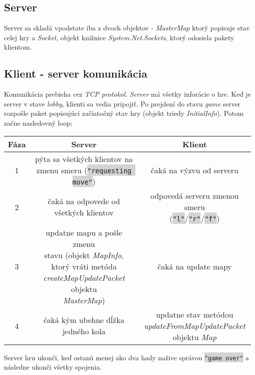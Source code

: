 \documentclass{article}
\newcommand{\code}[1]{\colorbox{lightgray}{\lstinline{#1}}}
\begin{document}
\subsection{Server}

Server sa skladá vpodstate iba z dvoch objektov - \textit{MasterMap} ktorý popisuje stav celej hry a \textit{Socket}, objekt knižnice \textit{System.Net.Sockets}, ktorý odosiela pakety klientom.

\subsection{Klient - server komunikácia}

Komunikácia prebieha cez \textit{TCP protokol}. \textit{Server} má všetky inforácie o hre.
Keď je server v stave \textit{lobby}, klienti sa vedia pripojiť. Po prejdení do stavu \textit{game} server rozpošle paket popisujúci začiatočný stav hry (objekt triedy \textit{InitialInfo}). Potom začne nasledovný loop:

\begin{center}
    \begin{tabular}{|c|c|c|}
        \hline
        Fáza & \textbf{Server} & \textbf{Klient} \\
        \hline
        \hline
        1 & \makecell{pýta sa všetkých klientov na \\zmenu smeru (\code{"requesting move"})} & čaká na výzvu od serveru \\
        \hline
        2 & čaká na odpovede od všetkých klientov & \makecell{odpovedá serveru zmenou smeru\\ (\code{"l"}/\code{"r"}/\code{"f"})}\\
        \hline
        3 & \makecell{updatne mapu a pošle zmenu\\stavu (objekt \textit{MapInfo}, \\ktorý vráti metóda\\ \textit{createMapUpdatePacket} objektu \\\textit{MasterMap})} & čaká na update mapy \\
        \hline
        4 & čaká kým ubehne dĺžka jedného kola & \makecell{updatne stav metódou \\\textit{updateFromMapUpdatePacket} \\objektu \textit{Map}} \\
        \hline
    \end{tabular}
\end{center}

Server hru ukonči, keď ostanú menej ako dva hady nažive správou \code{"game over"} a následne ukonči všetky spojenia.
\end{document}
